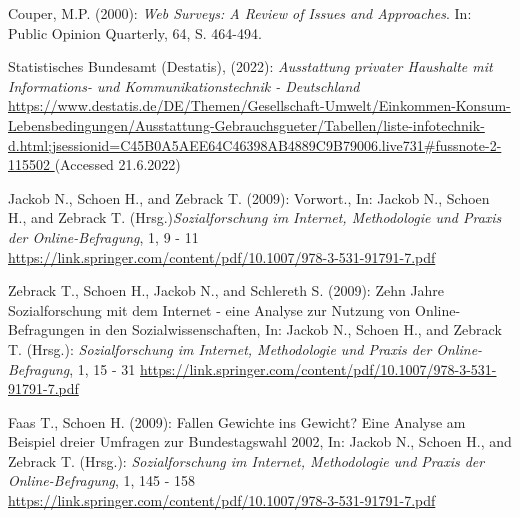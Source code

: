 \documentclass[a4paper , 11pt]{article}
\begin{document}
\begin{description}

\item Couper, M.P. (2000): \textit{Web Surveys: A Review of Issues and Approaches}. In: Public Opinion Quarterly, 64, S.
464-494.

\item Statistisches Bundesamt (Destatis), (2022): \textit{Ausstattung privater Haushalte mit Informations- und Kommunikationstechnik - Deutschland} \url{https://www.destatis.de/DE/Themen/Gesellschaft-Umwelt/Einkommen-Konsum-Lebensbedingungen/Ausstattung-Gebrauchsgueter/Tabellen/liste-infotechnik-d.html;jsessionid=C45B0A5AEE64C46398AB4889C9B79006.live731#fussnote-2-115502 } (Accessed 21.6.2022)


\item Jackob N., Schoen H., and Zebrack T. (2009): Vorwort., In: Jackob N., Schoen H., and Zebrack T. (Hrsg.)\textit{Sozialforschung
im Internet, Methodologie und Praxis
der Online-Befragung}, 1, 9 - 11  \url{https://link.springer.com/content/pdf/10.1007/978-3-531-91791-7.pdf}

\item Zebrack T., Schoen H., Jackob N., and Schlereth S. (2009): Zehn Jahre Sozialforschung mit dem Internet - eine Analyse zur Nutzung von Online-Befragungen in den Sozialwissenschaften, In: Jackob N., Schoen H., and Zebrack T. (Hrsg.): \textit{Sozialforschung
im Internet, Methodologie und Praxis
der Online-Befragung}, 1, 15 - 31  \url{https://link.springer.com/content/pdf/10.1007/978-3-531-91791-7.pdf}

\item  Faas T., Schoen H. (2009): Fallen Gewichte ins Gewicht? Eine Analyse am Beispiel dreier Umfragen zur Bundestagswahl 2002, In: Jackob N., Schoen H., and Zebrack T. (Hrsg.): \textit{Sozialforschung
im Internet, Methodologie und Praxis
der Online-Befragung}, 1, 145 - 158  \url{https://link.springer.com/content/pdf/10.1007/978-3-531-91791-7.pdf}

\end{description}
 
\end{document}
